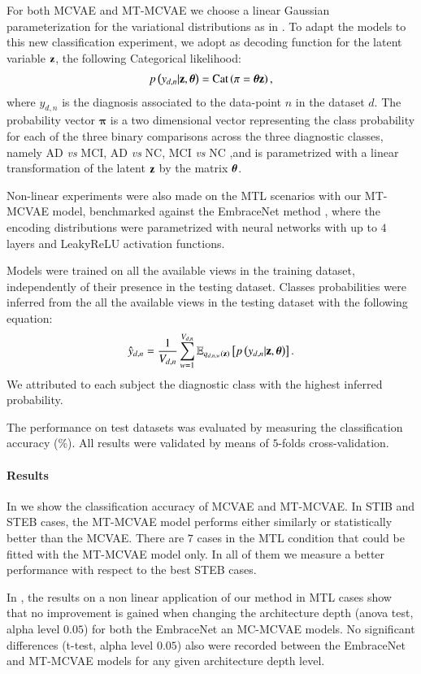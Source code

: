 For both MCVAE and MT-MCVAE we choose a linear Gaussian parameterization for the variational distributions as in .
To adapt the models to this new classification experiment, we adopt as decoding function for the latent variable $\mathbf{z}$, the following Categorical likelihood:
\begin{align}
\label{eq:classifier}
p\left(y_{d,n}|\mathbf{z},\boldsymbol{\theta}\right) = \operatorname{Cat}\left(\mathbf{\pi}=\boldsymbol{\theta}\mathbf{z}\right),
\end{align}
where $y_{d,n}$ is the diagnosis associated to the data-point $n$ in the dataset $d$.
The probability vector $\mathbf{\pi}$ is a two dimensional vector representing the class probability for each of the three binary comparisons across the three diagnostic classes, namely AD \textit{vs} MCI, AD \textit{vs} NC, MCI \textit{vs} NC ,and is parametrized with a linear transformation of the latent $\mathbf{z}$ by the matrix $\boldsymbol{\theta}$.

Non-linear experiments were also made on the MTL scenarios with our MT-MCVAE model, benchmarked against the EmbraceNet method \citep{embracenet}, where the encoding distributions were parametrized with neural networks with up to $4$ layers and LeakyReLU activation functions.

Models were trained on all the available views in the training dataset, independently of their presence in the testing dataset.
Classes probabilities were inferred from the all the available views in the testing dataset with the following equation:
\begin{equation}\label{eq:reconstructiony}
\begin{aligned}
\hat{y}_{d,n} = \frac{1}{V_{d, n}} \sum_{w=1}^{V_{d, n}} \operatorname{\mathbb{E}}_{q_{d,n,w}(\mathbf{z})}\left[p\left(y_{d,n}|\mathbf{z},\boldsymbol{\theta}\right)\right].
\end{aligned}
\end{equation}
We attributed to each subject the diagnostic class with the highest inferred probability.

The performance on test datasets was evaluated by measuring the classification accuracy (\%).
All results were validated by means of $5$-folds cross-validation.

\paragraph{Results}
In  we show the classification accuracy of MCVAE and MT-MCVAE.
In STIB and STEB cases, the MT-MCVAE model performs either similarly or statistically better than the MCVAE.
There are $7$ cases in the MTL condition  that could be fitted with the MT-MCVAE model only.
In all of them we measure a better performance with respect to the best STEB cases.

In , the results on a non linear application of our method in MTL cases show
that no improvement is gained when changing the architecture depth (anova test, alpha level $0.05$) for both the EmbraceNet an MC-MCVAE models.
No significant differences (t-test, alpha level $0.05$) also were recorded between the EmbraceNet and MT-MCVAE models for any given architecture depth level.
